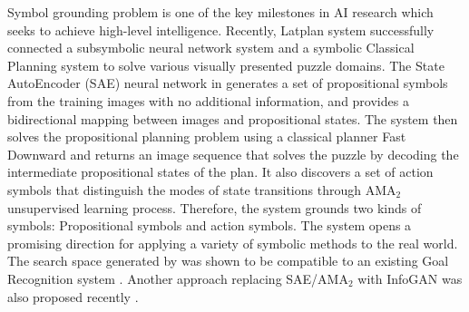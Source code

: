 Symbol grounding problem \cite{harnad1990symbol,Steels2008} is one of the key milestones in AI research
which seeks to achieve high-level intelligence.
% 
% 
Recently, Latplan system \cite[]{Asai2018} successfully
connected a subsymbolic neural network system and a symbolic Classical Planning system
to solve various visually presented puzzle domains.
The State AutoEncoder (SAE) neural network in \latentplanner
generates a set of propositional symbols from the training images with no additional information,
and provides a bidirectional mapping between images and propositional states.
% 
The system then solves the propositional planning problem using a classical planner Fast Downward \cite{Helmert04}
and returns an image sequence that solves the puzzle
by decoding the intermediate propositional states of the plan.
It also discovers a set of action symbols that distinguish the modes of
state transitions through AMA$_2$ unsupervised learning process.
Therefore, the system grounds two kinds of symbols:
Propositional symbols and action symbols.
% 
The system opens a promising direction for applying a variety of symbolic methods to the real world.
The search space generated by \latentplanner was shown to be compatible
to an existing Goal Recognition system \cite{amado2018goal}.
Another approach replacing SAE/AMA$_2$ with InfoGAN was also proposed recently \cite{kurutach2018learning}.

